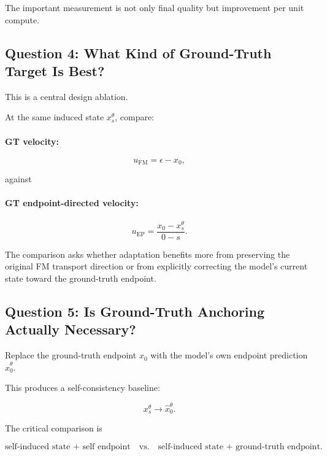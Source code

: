 \documentclass[11pt]{article}
\begin{document}
The important measurement is not only final quality but improvement per unit
compute.

\subsection{Question 4: What Kind of Ground-Truth Target Is Best?}

This is a central design ablation.

At the same induced state $x_s^\theta$, compare:

\paragraph{GT velocity:}

\begin{equation}
u_{\mathrm{FM}}
=
\epsilon-x_0,
\end{equation}

against

\paragraph{GT endpoint-directed velocity:}

\begin{equation}
u_{\mathrm{EP}}
=
\frac{x_0-x_s^\theta}{0-s}.
\end{equation}

The comparison asks whether adaptation benefits more from preserving the
original FM transport direction or from explicitly correcting the model's
current state toward the ground-truth endpoint.

\subsection{Question 5: Is Ground-Truth Anchoring Actually Necessary?}

Replace the ground-truth endpoint $x_0$ with the model's own endpoint
prediction $\hat{x}_0^\theta$.

This produces a self-consistency baseline:

\begin{equation}
x_s^\theta
\rightarrow
\hat{x}_0^\theta.
\end{equation}

The critical comparison is

\begin{equation}
\boxed{
\text{self-induced state + self endpoint}
\quad\text{vs.}\quad
\text{self-induced state + ground-truth endpoint}.
}
\end{equation}
\end{document}
